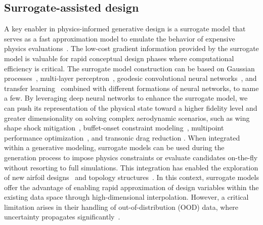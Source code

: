 \subsection{Surrogate-assisted design}
A key enabler in physics-informed generative design is a surrogate model that serves as a fast approximation model to emulate the behavior of expensive physics evaluations~\cite{aa.Liem2015, aa.Li2022b, aa.Paiva2010}. The low-cost gradient information provided by the surrogate model is valuable for rapid conceptual design phases where computational efficiency is critical. The surrogate model construction can be based on Gaussian processes~\cite{aa.Liem2015, aa.Bouhlel2019,aa.Hwang2018}, multi-layer perceptron~\cite{aa.Li2021b}, geodesic convolutional neural networks~\cite{aa.Baque2018}, and transfer learning~\cite{aa.Yang2025} combined with different formations of neural networks, to name a few. By leveraging deep neural networks to enhance the surrogate model, we can push its representation of the physical state toward a higher fidelity level and greater dimensionality on solving complex aerodynamic scenarios, such as wing shape shock mitigation~\cite{aa.Li2021b}, buffet-onset constraint modeling~\cite{aa.Li2022c}, multipoint performance optimization~\cite{aa.Lin2025}, and transonic drag reduction \cite{aa.Zhang2021}. When integrated within a generative modeling, surrogate models can be used during the generation process to impose physics constraints or evaluate candidates on-the-fly without resorting to full simulations. This integration has enabled the exploration of new airfoil designs~\cite{aa.Li2019,aa.Chen2020} and topology structures~\cite{aa.Giannone2023}. In this context, surrogate models offer the advantage of enabling rapid approximation of design variables within the existing data space through high-dimensional interpolation. However, a critical limitation arises in their handling of out-of-distribution (OOD) data, where uncertainty propagates significantly~\cite{aa.Owen2017}.

